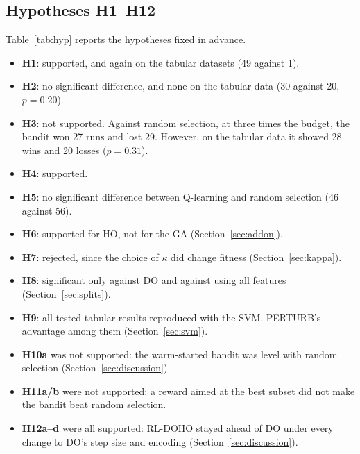 \documentclass[pdflatex,sn-basic]{sn-jnl}
\begin{document}
\subsection{Hypotheses H1--H12}
Table~\ref{tab:hyp} reports the hypotheses fixed in advance.
\begin{itemize}
\item \textbf{H1}: supported, and again on the tabular datasets (49 against 1).
\item \textbf{H2}: no significant difference, and none on the tabular data (30 against 20, $p=0.20$).
\item \textbf{H3}: not supported. Against random selection, at three times the budget, the bandit won 27 runs and lost 29. However, on the tabular data it showed 28 wins and 20 losses ($p=0.31$).
\item \textbf{H4}: supported.
\item \textbf{H5}: no significant difference between Q-learning and random selection (46 against 56).
\item \textbf{H6}: supported for HO, not for the GA (Section~\ref{sec:addon}).
\item \textbf{H7}: rejected, since the choice of $\kappa$ did change fitness (Section~\ref{sec:kappa}).
\item \textbf{H8}: significant only against DO and against using all features (Section~\ref{sec:splits}).
\item \textbf{H9}: all tested tabular results reproduced with the SVM, PERTURB's advantage among them (Section~\ref{sec:svm}).
\item \textbf{H10a} was not supported: the warm-started bandit was level with random selection (Section~\ref{sec:discussion}).
\item \textbf{H11a/b} were not supported: a reward aimed at the best subset did not make the bandit beat random selection.
\item \textbf{H12a--d} were all supported: RL-DOHO stayed ahead of DO under every change to DO's step size and encoding (Section~\ref{sec:discussion}).
\end{itemize}
\end{document}

